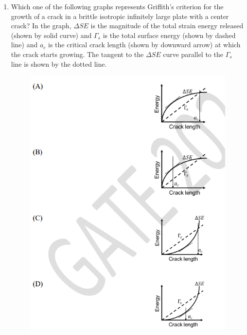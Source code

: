\documentclass[journal]{IEEEtran}
\theoremstyle{remark}
\begin{document}
\begin{enumerate}[resume]
\begin{multicols}{2}
\begin{enumerate}
\item P-1, Q-3, R-4, S-2
\item P-2, Q-3, R-1, S-4
\item P-3, Q-1, R-4, S-2
\item P-2, Q-4, R-1, S-3
\end{enumerate}
\end{multicols}

\item Which one of the following graphs represents Griffith's criterion for the growth of a crack in a brittle isotropic infinitely large plate with a center crack? In the graph, $\Delta SE$ is the magnitude of the total strain energy released (shown by solid curve) and $\Gamma_s$ is the total surface energy (shown by dashed line) and $a_c$ is the critical crack length (shown by downward arrow) at which the crack starts growing. The tangent to the $\Delta SE$ curve parallel to the $\Gamma_s$ line is shown by the dotted line. \hfill{}
\begin{figure}[H]
    \centering
    \includegraphics[width=0.6\columnwidth]{figs/Q.45.png}
    \caption{}
    \label{fig:placeholder}
\end{figure}




\end{enumerate}
\end{document}
